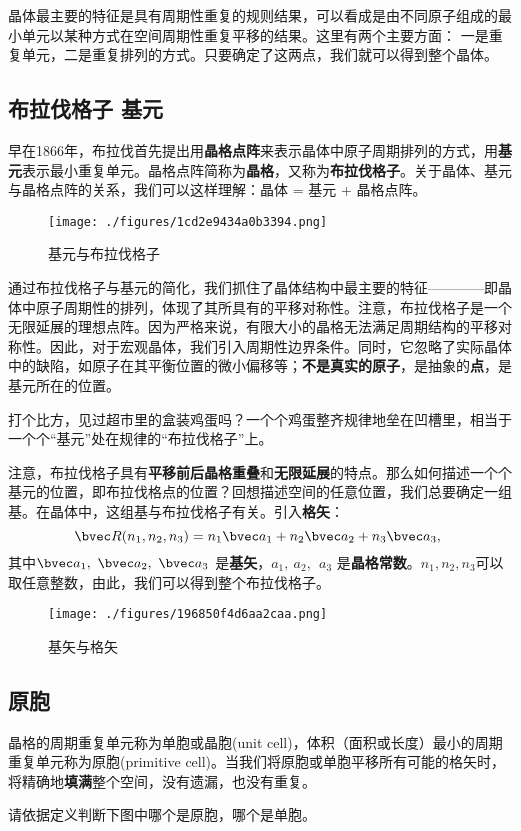 
晶体最主要的特征是具有周期性重复的规则结果，可以看成是由不同原子组成的最小单元以某种方式在空间周期性重复平移的结果。这里有两个主要方面：
一是重复单元，二是重复排列的方式。只要确定了这两点，我们就可以得到整个晶体。

\subsection{布拉伐格子 基元}
早在1866年，布拉伐首先提出用\textbf{晶格点阵}来表示晶体中原子周期排列的方式，用\textbf{基元}表示最小重复单元。晶格点阵简称为\textbf{晶格}，又称为\textbf{布拉伐格子}。关于晶体、基元与晶格点阵的关系，我们可以这样理解：晶体 = 基元 + 晶格点阵。
\begin{figure}[ht]
\centering
\texttt{[image: ./figures/1cd2e9434a0b3394.png]}
\caption{基元与布拉伐格子} \label{fig_BraLat_1}
\end{figure}

通过布拉伐格子与基元的简化，我们抓住了晶体结构中最主要的特征————即晶体中原子周期性的排列，体现了其所具有的平移对称性。注意，布拉伐格子是一个无限延展的理想点阵。因为严格来说，有限大小的晶格无法满足周期结构的平移对称性。因此，对于宏观晶体，我们引入周期性边界条件。同时，它忽略了实际晶体中的缺陷，如原子在其平衡位置的微小偏移等；\textbf{不是真实的原子}，是抽象的\textbf{点}，是基元所在的位置。

打个比方，见过超市里的盒装鸡蛋吗？一个个鸡蛋整齐规律地垒在凹槽里，相当于一个个“基元”处在规律的“布拉伐格子”上。

注意，布拉伐格子具有\textbf{平移前后晶格重叠}和\textbf{无限延展}的特点。那么如何描述一个个基元的位置，即布拉伐格点的位置？回想描述空间的任意位置，我们总要确定一组基。在晶体中，这组基与布拉伐格子有关。引入\textbf{格矢}：
\begin{equation}
\bvec R(n_1, n_2, n_3) = n_1 \bvec a_1 + n_2 \bvec a_2 + n_3 \bvec a_3,~ 
\end{equation}
其中$\bvec a_1,~\bvec a_2,~\bvec a_3$ 是\textbf{基矢}，$a_1,~ a_2,~\ a_3$ 是\textbf{晶格常数}。$n_1, n_2, n_3$可以取任意整数，由此，我们可以得到整个布拉伐格子。

\begin{figure}[ht]
\centering
\texttt{[image: ./figures/196850f4d6aa2caa.png]}
\caption{基矢与格矢} \label{fig_BraLat_2}
\end{figure}

\subsection{原胞}
晶格的周期重复单元称为单胞或晶胞(unit cell)，体积（面积或长度）最小的周期重复单元称为原胞(primitive cell)。当我们将原胞或单胞平移所有可能的格矢时，将精确地\textbf{填满}整个空间，没有遗漏，也没有重复。
\begin{exercise}{}
请依据定义判断下图中哪个是原胞，哪个是单胞。
\end{exercise}

